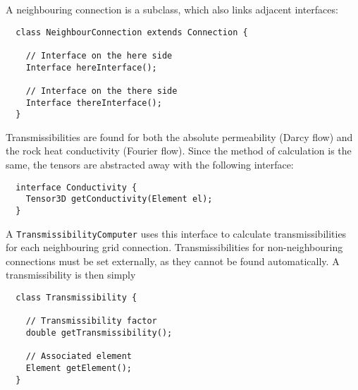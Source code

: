 A neighbouring connection is a subclass, which also links adjacent
interfaces:
\begin{lstlisting}
  class NeighbourConnection extends Connection {

    // Interface on the here side
    Interface hereInterface();

    // Interface on the there side
    Interface thereInterface();
  }
\end{lstlisting}



Transmissibilities are found for both the absolute permeability (Darcy
flow) and the rock heat conductivity (Fourier flow). Since the method
of calculation is the same, the tensors are abstracted away with the
following interface:
\begin{lstlisting}
  interface Conductivity {
    Tensor3D getConductivity(Element el);
  }
\end{lstlisting}

A \texttt{TransmissibilityComputer} uses this interface to calculate
transmissibilities for each neighbouring grid connection.
Transmissibilities for non-neighbouring connections must be set
externally, as they cannot be found automatically. A transmissibility
is then simply
\begin{lstlisting}
  class Transmissibility {

    // Transmissibility factor
    double getTransmissibility();

    // Associated element
    Element getElement();
  }
\end{lstlisting}

